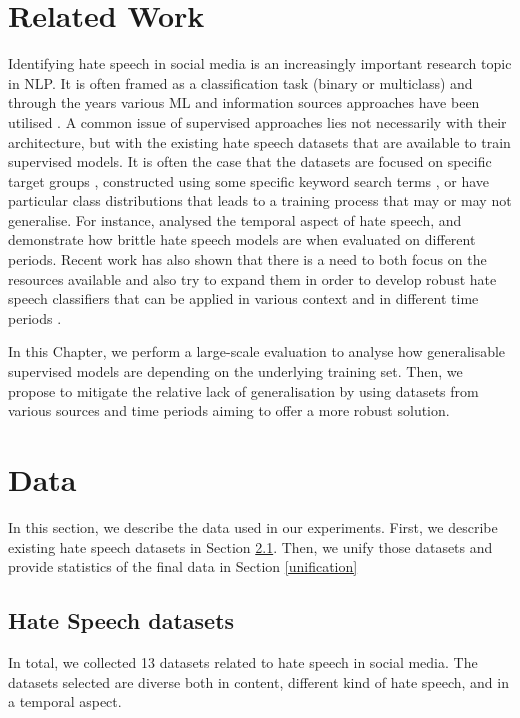 \section{Related Work}
Identifying hate speech in social media is an increasingly important research topic in \ac{NLP}. It is often framed as a classification task (binary or multiclass) and through the years various \ac{ML} and information sources approaches have been utilised \cite{mullah2021advances,ali2022hate,khanday2022detecting,del2023socialhaterbert}. A common issue of supervised approaches lies not necessarily with their architecture, but with the existing hate speech datasets that are available to train supervised models. It is often the case that the datasets are focused on specific target groups \cite{grimminger-klinger-2021-hate}, constructed using some specific keyword search terms \cite{Talat2016HatefulSO,zampieri2019predicting}, or have particular class distributions \cite{basile2019semeval} that leads to a training process that may or may not generalise. For instance, \citet{florio2020time} analysed the temporal aspect of hate speech, and demonstrate how brittle hate speech models are when evaluated on different periods. Recent work  has also shown that there is a need to both focus on the resources available and also try to expand them in order to develop robust hate speech classifiers that can be applied in various context and in different time periods \cite{bourgeade-etal-2023-learn, bose-etal-2022-dynamically}.

In this Chapter, we perform a large-scale evaluation to analyse how generalisable supervised models are depending on the underlying training set. Then, we propose to mitigate the relative lack of generalisation by using datasets from various sources and time periods aiming to offer a more robust solution. 
\section{Data}

In this section, we describe the data used in our experiments. First, we describe existing hate speech datasets in Section \ref{hatedatasets}. Then, we unify those datasets and provide statistics of the final data in Section \ref{unification}

    \subsection{Hate Speech datasets}
    \label{hatedatasets}
    In total, we collected 13 datasets related to hate speech in social media. The datasets selected are diverse both in content, different kind of hate speech, and in a temporal aspect.
        
